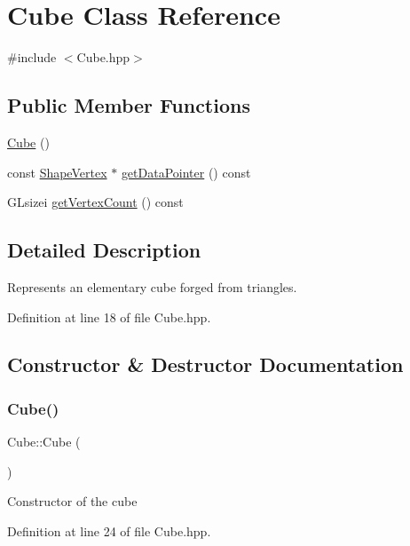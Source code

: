 \hypertarget{class_cube}{}\section{Cube Class Reference}
\label{class_cube}


{\ttfamily \#include $<$Cube.\+hpp$>$}

\subsection*{Public Member Functions}
\begin{DoxyCompactItemize}
\item 
\hyperlink{class_cube_a06f3d86fb63e3aad08623610aa3c17b4}{Cube} ()
\item 
const \hyperlink{structglimac_1_1_shape_vertex}{Shape\+Vertex} $\ast$ \hyperlink{class_cube_a0afd868974cd7d967c8f1998d8fffcd1}{get\+Data\+Pointer} () const
\item 
G\+Lsizei \hyperlink{class_cube_aee60e03ccb085274fb3619713d6999a4}{get\+Vertex\+Count} () const
\end{DoxyCompactItemize}


\subsection{Detailed Description}
Represents an elementary cube forged from triangles. 

Definition at line 18 of file Cube.\+hpp.



\subsection{Constructor \& Destructor Documentation}
\mbox{\label{class_cube_a06f3d86fb63e3aad08623610aa3c17b4}} 
\subsubsection{\texorpdfstring{Cube()}{Cube()}}
{\footnotesize\ttfamily Cube\+::\+Cube (\begin{DoxyParamCaption}{ }\end{DoxyParamCaption})\hspace{0.3cm}{\ttfamily [inline]}}

Constructor of the cube 

Definition at line 24 of file Cube.\+hpp.



